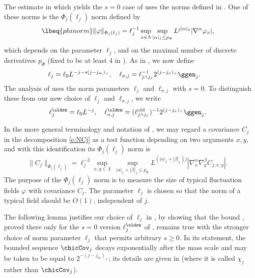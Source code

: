 The estimate in \cite{ST-phi4} which yields the $s = 0$ case of 
uses the norms defined in \cite{BS-rg-IE}.
One of these norms is the $\Phi_j(\ell_j)$ norm defined by
\begin{equation}
\lbeq{phinorm}
\|\varphi\|_{\Phi_j(\ell_j)}
=
\ell_j^{-1}
\sup_{x\in \Lambda}
\sup_{|\alpha|_1  \le p_\Phi}
L^{j|\alpha|_1}
|\nabla^{\alpha} \varphi_x|,
\end{equation}
which depends on the parameter $\ell_j$,
and on the maximal number of discrete derivatives $p_\Phi$
(fixed to be at least $4$ in \cite{BS-rg-IE}).
As in , we now define
\begin{align}
\label{e:elldef}
\ell_j &= \ell_0 L^{-j - s (j - j_m)_+}, \quad
\ell_{\sigma,j}
=
\ell_{j \wedge j_{x}}^{-1} 2^{(j - j_{x})_+} \ggen_j.
\end{align}
The analysis of \cite{BS-rg-IE,BS-rg-step} uses the norm parameters $\ell_j$ and $\ell_{\sigma,j}$ with $s = 0$.
To distinguish these from our
new choice  of $\ell_j$ and $\ell_{\sigma,j}$, we write
\begin{equation}
\label{e:ell-old}
    \ell_j^\oldrm = \ell_0 L^{-j},
    \quad
    \ell_{\sigma,j}^\oldrm  =
    (\ell_{j \wedge j_{x}}^{\rm old})^{-1}2^{(j - j_{x})_+}\ggen_j.
\end{equation}

In the more general terminology and notation of \cite{BS-rg-norm,BS-rg-IE},
we may regard a covariance $C_j$
in the decomposition \eqref{e:NCj}
as a test function depending on
two arguments $x,y$, and with this identification its $\Phi_j(\ell_j)$
norm is
\begin{equation}
    \label{e:Phinorm}
    \|C_j\|_{\Phi_{j}(\ell_j)}  =
    \ell_j^{-2}
    \sup_{x,y\in \Lambda}
    \;
    \sup_{|\alpha|_1 + |\beta|_1 \le p_\Phi}
    L^{(|\alpha|_1+  |\beta|_1)j}
    |\nabla_x^{\alpha} \nabla_y^{\beta} C_{j;x,y}|.
\end{equation}
The purpose of the $\Phi_j(\ell_j)$ norm is to measure the size of typical
fluctuation fields $\varphi$ with covariance $C_j$.
The parameter $\ell_j$ is chosen so that the norm of a typical field should
be $O(1)$, independent of $j$.

The following lemma justifies our choice of $\ell_j$
in , by showing that the
bound \cite[\eqref{IE-e:CLbd}]{BS-rg-IE}, proved there only for the $s=0$ version
$\ell_j^\oldrm$ of ,
remains true with the stronger
choice of norm parameter $\ell_j$ that permits arbitrary $s \ge 0$.
In its statement, the bounded sequence $\chicCov_j$ decays exponentially after the
mass scale and may be taken to be equal to
$2^{-(j-j_m)_+}$; its details are given
in \cite[Section~\ref{IE-sec:frp}]{BS-rg-IE} (where it is called $\chi_j$ rather
than $\chicCov_j$).

